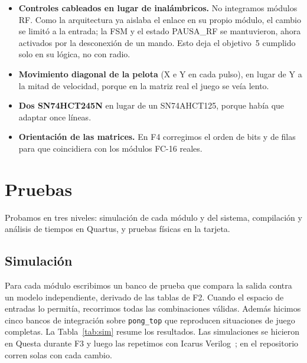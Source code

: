 \documentclass[conference,a4paper]{IEEEtran}
\begin{document}
\begin{itemize}
\item \textbf{Controles cableados en lugar de inalámbricos.} No integramos módulos RF. Como la arquitectura ya aislaba el enlace en su propio módulo, el cambio se limitó a la entrada; la FSM y el estado PAUSA\_RF se mantuvieron, ahora activados por la desconexión de un mando. Esto deja el objetivo~5 cumplido solo en su lógica, no con radio.
\item \textbf{Movimiento diagonal de la pelota} (X e Y en cada pulso), en lugar de Y a la mitad de velocidad, porque en la matriz real el juego se veía lento.
\item \textbf{Dos SN74HCT245N} en lugar de un SN74AHCT125, porque había que adaptar once líneas.
\item \textbf{Orientación de las matrices.} En F4 corregimos el orden de bits y de filas para que coincidiera con los módulos FC-16 reales.
\end{itemize}

\section{Pruebas}

Probamos en tres niveles: simulación de cada módulo y del sistema, compilación y análisis de tiempos en Quartus, y pruebas físicas en la tarjeta.

\subsection{Simulación}

Para cada módulo escribimos un banco de prueba que compara la salida contra un modelo independiente, derivado de las tablas de F2. Cuando el espacio de entradas lo permitía, recorrimos todas las combinaciones válidas. Además hicimos cinco bancos de integración sobre \texttt{pong\_top} que reproducen situaciones de juego completas. La Tabla~\ref{tab:sim} resume los resultados. Las simulaciones se hicieron en Questa durante F3 y luego las repetimos con Icarus Verilog~\cite{icarus}; en el repositorio corren solas con cada cambio.
\end{document}
